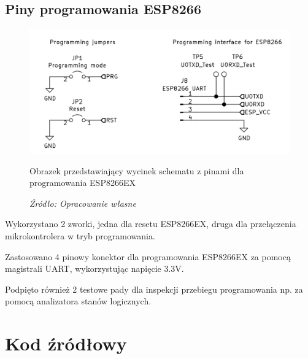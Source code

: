 \documentclass[12pt,a4paper,oneside]{memoir}
\begin{document}
\section{Piny programowania ESP8266}
\begin{figure}[!h]
	\centering
	\includegraphics[scale=0.4]{images/sch/sch-14.png}
	{\tytulyrozdzialow \footnotesize \caption[Schemat - programowanie wewnątrzukładowe] {Obrazek przedstawiający wycinek schematu z pinami dla programowania ESP8266EX}}
	\caption*{\textit{Źródło: Opracowanie własne}}
\end{figure}
\par Wykorzystano 2 zworki, jedna dla resetu ESP8266EX, druga dla przełączenia mikrokontrolera w tryb programowania.
\par Zastosowano 4 pinowy konektor dla programowania ESP8266EX za pomocą magistrali UART, wykorzystując napięcie 3.3V. 
\par Podpięto również 2 testowe pady dla inspekcji przebiegu programowania np. za pomocą analizatora stanów logicznych. 
\newpage
\chapter{Kod źródłowy} 
\end{document}
